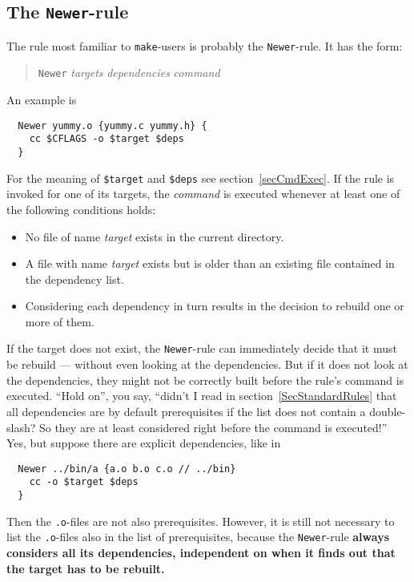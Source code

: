 \documentclass[12pt]{article}
\newcommand{\make}{\texttt{make}}
\begin{document}
\subsection{The \texttt{Newer}-rule}
\label{secNewer}
The rule most familiar to \make-users is probably the
\texttt{Newer}-rule. It has the form:
\begin{quote}
  \texttt{Newer} \textit{targets} \textit{dependencies} \textit{command}
\end{quote}
An example is
\begin{verbatim}
  Newer yummy.o {yummy.c yummy.h} {
    cc $CFLAGS -o $target $deps
  }
\end{verbatim}
For the meaning of \texttt{\$target} and \texttt{\$deps} see
section~\ref{secCmdExec}. If the rule is invoked for one of its
targets, the \textit{command} is executed whenever at least one of the
following conditions holds:
\begin{itemize}
\item No file of name \textit{target} exists in the current directory.
\item A file with name \textit{target} exists but is older than an
existing file contained in the dependency list.
\item Considering each dependency in turn results in the decision to
rebuild one or more of them.
\end{itemize}

If the target does not exist, the \texttt{Newer}-rule can immediately
decide that it must be rebuild --- without even looking at the
dependencies. But if it does not look at the dependencies, they might
not be correctly built before the rule's command is executed. ``Hold
on'', you say, ``didn't I read in section~\ref{SecStandardRules} that
all dependencies are by default prerequisites if the list does not
contain a double-slash? So they are at least considered right before
the command is executed!'' Yes, but suppose there are explicit
dependencies, like in
\begin{verbatim}
  Newer ../bin/a {a.o b.o c.o // ../bin} 
    cc -o $target $deps
  }
\end{verbatim}
Then the \texttt{.o}-files are not also prerequisites. However, it is
still not necessary to list the \texttt{.o}-files also in the list of
prerequisites, because the \texttt{Newer}-rule \textbf{always
considers all its dependencies, independent on when it finds out that
the target has to be rebuilt.}

\end{document}
